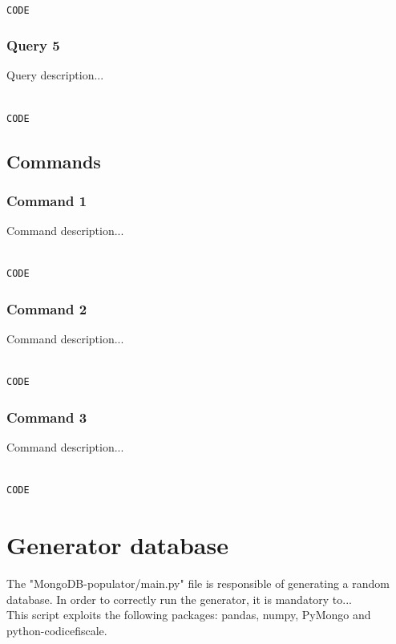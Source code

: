 \documentclass{article}
\begin{document}
\begin{lstlisting}[language=cypher, label=lst:cypher-example]

CODE

\end{lstlisting}
\subsubsection{Query 5}
Query description...

\begin{lstlisting}[language=cypher, label=lst:cypher-example]

CODE

\end{lstlisting}
\newpage
\subsection{Commands}
\subsubsection{Command 1}
Command description...

\begin{lstlisting}[language=cypher, label=lst:cypher-example]

CODE

\end{lstlisting}
\subsubsection{Command 2}
Command description...

\begin{lstlisting}[language=cypher, label=lst:cypher-example]

CODE

\end{lstlisting}
\subsubsection{Command 3}
Command description...

\begin{lstlisting}[language=cypher, label=lst:cypher-example]

CODE

\end{lstlisting}
\newpage
\section{Generator database}
The {\selectfont"MongoDB-populator/main.py"} file is responsible of generating a random database.
In order to correctly run the generator, it is mandatory to...
\\This script exploits the following packages: {\selectfont pandas, numpy, PyMongo and python-codicefiscale}.
\end{document}
